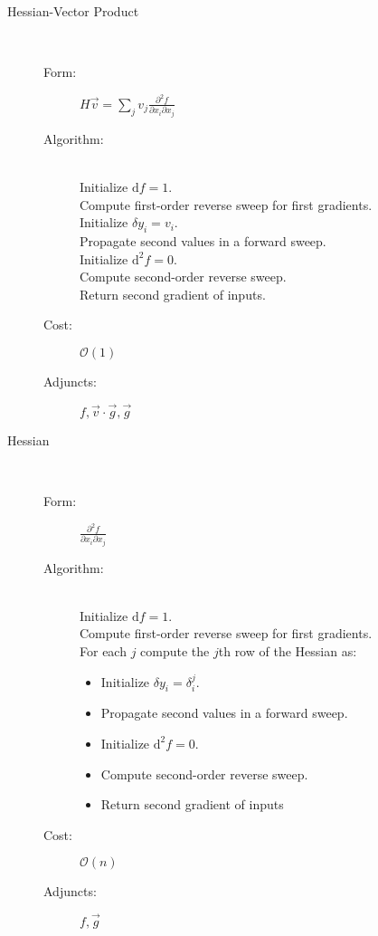 \documentclass[11pt]{article}
\begin{document}
\begin{description}
	\item[Hessian-Vector Product] \hfill \\
	\begin{description}
		\item[Form:] $\displaystyle H \vec{v} = \sum_{j} v_{j} \frac{ \partial^{2} f }{ \partial x_{i} \partial x_{j} } $
		\item[Algorithm:] \hfill \\
		Initialize $\mathrm{d} f = 1$. \\
		Compute first-order reverse sweep for first gradients. \\
		Initialize $\delta y_{i} = v_{i}$. \\
		Propagate second values in a forward sweep. \\
		Initialize $\mathrm{d}^{2} f = 0.$ \\
		Compute second-order reverse sweep. \\
		Return second gradient of inputs.
		\item[Cost:] $\mathcal{O} \! \left( 1 \right)$
		\item[Adjuncts:] $ f, \vec{v} \cdot \vec{g}, \vec{g}$
	\end{description}
	
	\item[Hessian] \hfill \\
	\begin{description}
		\item[Form:] $\displaystyle \frac{ \partial^{2} f }{ \partial x_{i} \partial x_{j} } $
		\item[Algorithm:] \hfill \\
		Initialize $\mathrm{d} f = 1$. \\
		Compute first-order reverse sweep for first gradients. \\
		For each $j$ compute the $j$th row of the Hessian as:
		\begin{itemize}
			\setlength{\itemsep}{0cm}
			\setlength{\parskip}{0cm}
			\item[] Initialize $\delta y_{i} = \delta^{j}_{i}$.
			\item[] Propagate second values in a forward sweep. 
			\item[] Initialize $\mathrm{d}^{2} f = 0.$
			\item[] Compute second-order reverse sweep.
			\item[] Return second gradient of inputs
		\end{itemize}
		\item[Cost:] $\mathcal{O} \! \left( n \right)$
		\item[Adjuncts:] $ f, \vec{g}$
	\end{description}
	

\end{description}
\end{document}
